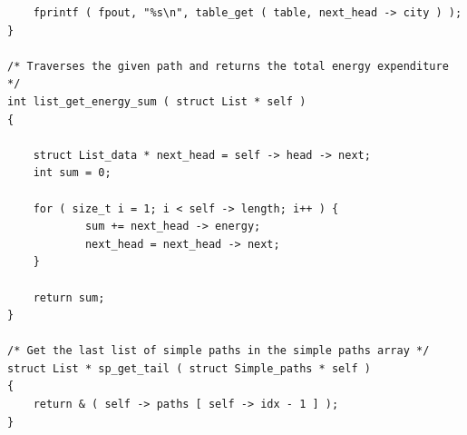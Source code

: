 \documentclass[11pt]{article}
\begin{document}
\begin{verbatim}
    fprintf ( fpout, "%s\n", table_get ( table, next_head -> city ) );
}

/* Traverses the given path and returns the total energy expenditure */
int list_get_energy_sum ( struct List * self )
{

    struct List_data * next_head = self -> head -> next;
    int sum = 0;

    for ( size_t i = 1; i < self -> length; i++ ) {
            sum += next_head -> energy;
            next_head = next_head -> next;
    }

    return sum;
}

/* Get the last list of simple paths in the simple paths array */
struct List * sp_get_tail ( struct Simple_paths * self )
{
    return & ( self -> paths [ self -> idx - 1 ] );
}
\end{verbatim}
\end{document}
